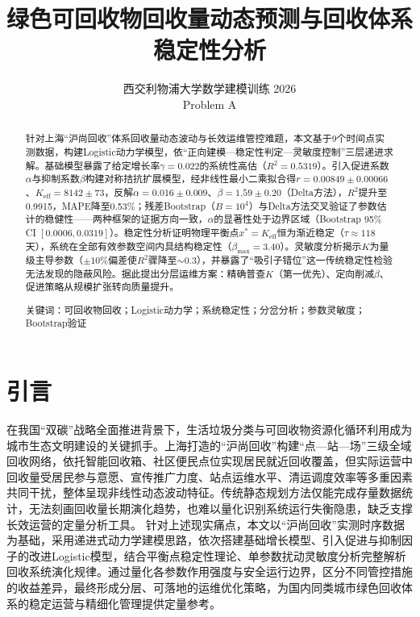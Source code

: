 \documentclass[12pt,a4paper]{ctexart}
\title{
    \heiti 绿色可回收物回收量动态预测与回收体系稳定性分析
}
\author{
    西交利物浦大学数学建模训练 2026\\
    Problem A
}
\date{}
\begin{document}
\pagestyle{plain}
\maketitle

\begin{abstract}
{\kaishu
针对上海``沪尚回收''体系回收量动态波动与长效运维管控难题，本文基于9个时间点实测数据，构建Logistic动力学模型，依``正向建模—稳定性判定—灵敏度控制''三层递进求解。基础模型暴露了给定增长率$\gamma=0.022$的系统性高估（$R^2=0.5319$）。引入促进系数$\alpha$与抑制系数$\beta$构建对称拮抗扩展模型，经非线性最小二乘拟合得$r=0.00849\pm0.00066$、$K_{\text{eff}}=8142\pm73$，反解$\alpha=0.016\pm0.009$、$\beta=1.59\pm0.20$（Delta方法），$R^2$提升至0.9915，MAPE降至0.53\%；残差Bootstrap（$B=10^4$）与Delta方法交叉验证了参数估计的稳健性——两种框架的证据方向一致，$\alpha$的显著性处于边界区域（Bootstrap 95\% CI $[0.0006,0.0319]$）。稳定性分析证明物理平衡点$x^*=K_{\text{eff}}$恒为渐近稳定（$\tau\approx118$天），系统在全部有效参数空间内具结构稳定性（$\beta_{\max}=3.40$）。灵敏度分析揭示$K$为量级主导参数（$\pm10\%$偏差使$R^2$骤降至$\sim0.3$），并暴露了``吸引子错位''这一传统稳定性检验无法发现的隐蔽风险。据此提出分层运维方案：精确普查$K$（第一优先）、定向削减$\beta$、促进策略从规模扩张转向质量提升。

{\heiti 关键词}：可回收物回收；Logistic动力学；系统稳定性；分岔分析；参数灵敏度；Bootstrap验证
}
\end{abstract}

\newpage

\tableofcontents

\newpage

\section{引言}
在我国“双碳”战略全面推进背景下，生活垃圾分类与可回收物资源化循环利用成为城市生态文明建设的关键抓手。上海打造的“沪尚回收”构建“点—站—场”三级全域回收网络，依托智能回收箱、社区便民点位实现居民就近回收覆盖，但实际运营中回收量受居民参与意愿、宣传推广力度、站点运维水平、清运调度效率等多重因素共同干扰，整体呈现非线性动态波动特征。传统静态规划方法仅能完成存量数据统计，无法刻画回收量长期演化趋势，也难以量化识别系统运行失衡隐患，缺乏支撑长效运营的定量分析工具。
针对上述现实痛点，本文以“沪尚回收”实测时序数据为基础，采用递进式动力学建模思路，依次搭建基础增长模型、引入促进与抑制因子的改进Logistic模型，结合平衡点稳定性理论、单参数扰动灵敏度分析完整解析回收系统演化规律。通过量化各参数作用强度与安全运行边界，区分不同管控措施的收益差异，最终形成分层、可落地的运维优化策略，为国内同类城市绿色回收体系的稳定运营与精细化管理提供定量参考。
\end{document}
